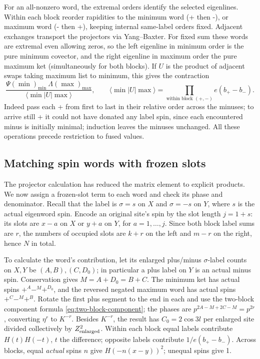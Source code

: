 For an all-nonzero word, the extremal orders identify the selected eigenlines. Within each block reorder rapidities to the minimum word (+ then -), or maximum word (- then +), keeping internal same-label orders fixed. Adjacent exchanges transport the projectors via Yang--Baxter. For fixed sum these words are extremal even allowing zeros, so the left eigenline in minimum order is the pure minimum covector, and the right eigenline in maximum order the pure maximum ket (simultaneously for both blocks). If \(U\) is the product of adjacent swaps taking maximum list to minimum, this gives the contraction
\[
 \frac{\Psi(\min)_{\min}\ \Lambda(\max)_{\max}}
 {\langle\min|U|\max\rangle},\qquad
 \langle\min|U|\max\rangle=\prod_{\text{within block }(+,-)} e(b_+-b_-).
\]
Indeed pass each + from first to last in their relative order across the minuses; to arrive still + it could not have donated any label spin, since each encountered minus is initially minimal; induction leaves the minuses unchanged. All these operations precede restriction to fused values.

\subsection{Matching spin words with frozen slots}

The projector calculation has reduced the matrix element to explicit products. We now assign a frozen-slot term to each word and check its phase and denominator. Recall that the label is \(\sigma=s\) on \(X\) and \(\sigma=-s\) on \(Y\), where \(s\) is the actual eigenword spin. Encode an original site's spin by the slot length \(j=1+s\): its slots are \(x-a\) on \(X\) or \(y+a\) on \(Y\), for \(a=1,\ldots,j\). Since both block label sums are \(r\), the numbers of occupied slots are \(k+r\) on the left and \(m-r\) on the right, hence \(N\) in total.

To calculate the word's contribution, let its enlarged plus/minus \(\sigma\)-label counts on \(X,Y\) be \((A,B),(C,D_0)\); in particular a plus label on \(Y\) is an actual minus spin. Conservation gives \(M=A+D_0=B+C\). The minimum ket has actual spins \(+^A-^M+^{D_0}\), and the reversed negated maximum word has actual spins \(+^C-^M+^B\). Rotate the first plus segment to the end in each and use the two-block component formula \eqref{eq:two-block-component}; the phases are \(p^{2A-M+2C-M}=p^{2r}\), converting \(\eta^r\) to \(K^{-r}\). Besides \(K^{-r}\), the result has \(C_0=2\cos 3l\) per enlarged site divided collectively by \(Z_{\rm enlarged}^2\). Within each block equal labels contribute \(H(t)H(-t)\), \(t\) the difference; opposite labels contribute \(1/e(b_+-b_-)\). Across blocks, equal \emph{actual} spins \(n\) give \(H(-n(x-y))^2\); unequal spins give 1.

